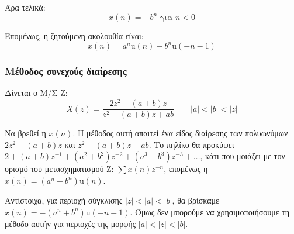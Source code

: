 \documentclass[11pt,a4paper,notitlepage,fleqn]{article}
\begin{document}
\begin{exercise}
\begin{itemize}
		Άρα τελικά:
		\[
		x(n) = -b^n \text{ για } n<0
		\]
	\end{itemize}

    Επομένως, η ζητούμενη ακολουθία είναι:
    \[
    x(n) = a^n\mathrm{u}(n) - b^n \mathrm{u}(-n-1)
    \]
\end{exercise}

\subsubsection{Μέθοδος συνεχούς διαίρεσης}
\begin{exercise}
	Δίνεται ο Μ/Σ Z:
	\[
	X(z) = \frac{2z^2 - (a+b)z}{z^2 - (a+b)z+ab}
	\qquad |a|<|b|<|z|
	\]

	Να βρεθεί η \( x(n) \).
	\tcblower
	Η μέθοδος αυτή απαιτεί ένα είδος διαίρεσης των πολυωνύμων \( 2z^2 - (a+b)z \)
	και \( z^2-(a+b)z + ab \).
	Το πηλίκο θα προκύψει \( 2 + (a+b)z^{-1} + (a^2+b^2)z^{-2} + (a^3+b^3)z^{-3} + \dots \), κάτι
	που μοιάζει με τον ορισμό του μετασχηματισμού Z: \( \sum x(n)z^{-n} \), επομένως η \( x(n) = \left(a^n+b^n\right)\mathrm{u}(n) \).
	
	Αντίστοιχα, για περιοχή σύγκλισης \( |z|<|a|<|b| \), θα βρίσκαμε \( x(n)=-\left(a^n+b^n\right)\mathrm{u}(-n-1) \). Όμως δεν μπορούμε να χρησιμοποιήσουμε τη μέθοδο αυτήν
	για περιοχές της μορφής \( |a|<|z|<|b| \).
\end{exercise}

\end{document}
